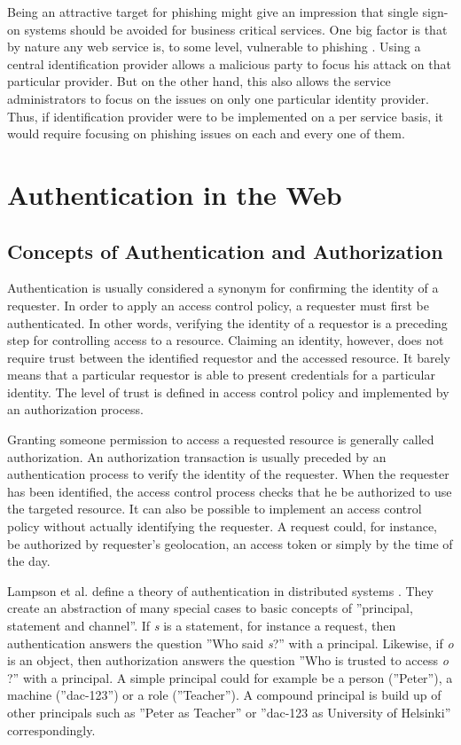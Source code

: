 \documentclass{tktltiki}
\begin{document}
        Being an attractive target for phishing might give an impression that single sign-on systems should be avoided for business critical services. One big factor is that by nature any web service is, to some level, vulnerable to phishing \cite{why_phishing_works_06}. Using a central identification provider allows a malicious party to focus his attack on that particular provider. But on the other hand, this also allows the service administrators to focus on the issues on only one particular identity provider. Thus, if identification provider were to be implemented on a per service basis, it would require focusing on phishing issues on each and every one of them.

      
    
\section{Authentication in the Web}



\subsection{Concepts of Authentication and Authorization}

    Authentication is usually considered a synonym for confirming the identity of a requester. In order to apply an access control policy, a requester must first be authenticated. In other words, verifying the identity of a requestor is a preceding step for controlling access to a resource. Claiming an identity, however, does not require trust between the identified requestor and the accessed resource. It barely means that a particular requestor is able to present credentials for a particular identity. The level of trust is defined in access control policy and implemented by an authorization process.

  Granting someone permission to access a requested resource is generally called authorization. An authorization transaction is usually preceded by an authentication process to verify the identity of the requester. When the requester has been identified, the access control process checks that he be authorized to use the targeted resource. It can also be possible to implement an access control policy without actually identifying the requester. A request could, for instance, be authorized by requester's geolocation, an access token or simply by the time of the day.
          
  Lampson et al. define a theory of authentication in distributed systems
\cite{lampson_distributed_1992}. They create an abstraction of many special
cases to basic concepts of ''principal, statement and channel''. If \emph{s}
is a statement, for instance a request, then authentication answers the
question ''Who said \emph{s}?'' with a principal. Likewise, if \emph{o} is an
object, then authorization answers the question ''Who is trusted to access
\emph{o} ?'' with a principal. A simple principal could for example be a
person (''Peter''), a machine (''dac-123'') or a role (''Teacher''). A
compound principal is build up of other principals such as ''Peter as
Teacher'' or ''dac-123 as University of Helsinki'' correspondingly.
\end{document}
